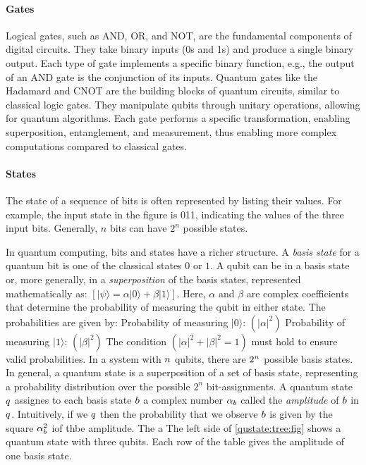 \paragraph{Gates}
Logical gates, such as AND, OR, and NOT, are the fundamental components of digital circuits. 
%
They take binary inputs (0s and 1s) and produce a single binary output.
%
Each type of gate implements a specific binary function, e.g., the output of an AND gate is the conjunction of its inputs.
%
Quantum gates like the Hadamard and CNOT are the building blocks of quantum circuits, similar to classical logic gates. They manipulate qubits through unitary operations, allowing for quantum algorithms. Each gate performs a specific transformation, enabling superposition, entanglement, and measurement, thus enabling more complex computations compared to classical gates.

\paragraph{States}
The state of a sequence of bits is often represented by listing their values. For example, the input state in the figure is 011, indicating the values of the three input bits. Generally, $n$ bits can have $2^n$ possible states. 
%

In quantum computing, bits and states have a richer structure.
%
A {\it basis state} for a quantum bit is one of the classical states $0$ or $1$.
%
A qubit can be in a basis state or, more generally, in a {\it superposition} of the basis states, represented mathematically as: $[|\psi⟩ = \alpha |0⟩ + \beta |1⟩ ]$.
Here, $\alpha$ and $\beta$ are complex coefficients that determine the probability of measuring the qubit in either state.
The probabilities are given by:
Probability of measuring $|0⟩$: $( |\alpha|^2 )$
Probability of measuring $|1⟩$: $( |\beta|^2 )$
The condition $( |\alpha|^2 + |\beta|^2 = 1 )$ must hold to ensure valid probabilities.
%
In a system with $n$ qubits, there are $2^n$ possible basis states.
%
In general, a quantum state is a superposition of a set of basis state, representing a probability distribution over the possible $2^n$ bit-assignments.
%
A quantum state $q$ assignes to each basis state $b$ a complex number $\alpha_b$ called the {\it amplitude} of $b$ in $q$.
%
Intuitively, if we  $q$ then the probability that we observe $b$ is given by the square $\alpha_b^2$ iof thbe amplitude.
%
The a
The left side of \cref{qustate:tree:fig} shows a quantum state with three qubits.
%
Each row of the table gives the amplitude of one basis state.
%


